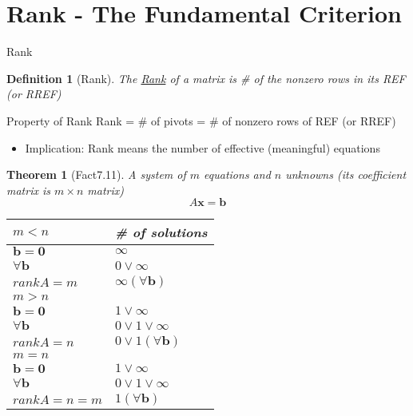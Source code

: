 \documentclass[a4paper,11pt]{article}
\newtheorem{defn}{Definition}
\newtheorem{thm}{Theorem}
\begin{document}
\section{Rank - The Fundamental Criterion} %
\label{sec:rank_the_fundamental_criterion}
\begin{frame}[t]{Rank}
	\begin{defn}
		[Rank] The \uline{Rank} of a matrix is \# of the nonzero rows in its REF (or RREF)
	\end{defn}
	\begin{block}
		{Property of Rank}
		Rank = \# of pivots = \# of nonzero rows of REF (or RREF)
	\end{block}
	\begin{itemize}
		\item Implication: Rank means the number of effective (meaningful) equations
	\end{itemize}
\end{frame}
\begin{thm}
	[Fact7.11] A system of $m$ equations and $n$ unknowns (its coefficient matrix is $m\times n$ matrix)\[
		A\mathbf{x} = \mathbf{b}
	\]		
	\begin{center}
		\begin{scriptsize}
			\begin{tabular}{l|l}
				 $m<n$& \# of solutions\\
				 \hline
				 $\mathbf{b}=\mathbf{0}$& $\infty$\\
				 $\forall \mathbf{b}$& $0\lor \infty$\\
				 $rank A = m$ & $\infty (\forall \mathbf{b})$\\
				 \hline\hline
				 $m>n$&\\
				 \hline
				 $\mathbf{b}=\mathbf{0}$& $1\lor \infty$\\
				 $\forall \mathbf{b}$& $0\lor 1\lor \infty$\\
				 $rank A = n$ & $0\lor 1 (\forall \mathbf{b})$\\
				 \hline\hline
				 $m=n$&\\
				 \hline
				 $\mathbf{b}=\mathbf{0}$& $1\lor \infty$\\
				 $\forall \mathbf{b}$& $0\lor 1\lor \infty$\\
				 $rank A = n=m$ & $ 1 (\forall \mathbf{b})$\\
			\end{tabular}
		\end{scriptsize}
		
	\end{center}
\end{thm}
\end{document}
